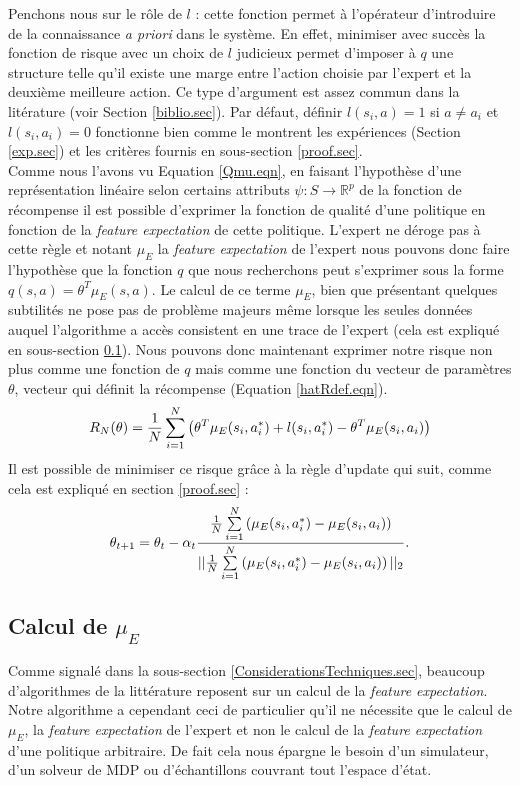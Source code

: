 \documentclass[publibook-draft]{CAp2012}
\begin{document}
Penchons nous sur le rôle de $l$ : cette fonction permet à l'opérateur d'introduire de la connaissance \emph{a priori} dans le système. En effet, minimiser avec succès la fonction de risque avec un choix de $l$ judicieux permet d'imposer à $q$ une structure telle qu'il existe une marge entre l'action choisie par l'expert et la deuxième meilleure action. Ce type d'argument est assez commun dans la litérature (voir Section \ref{biblio.sec}). Par défaut, définir $l(s_i,a) = 1$ si $a\neq a_i$ et $l(s_i,a_i)=0$ fonctionne bien comme le montrent les expériences (Section \ref{exp.sec}) et les critères fournis en sous-section \ref{proof.sec}.\\


Comme nous l'avons vu Equation \eqref{Qmu.eqn}, en faisant l'hypothèse d'une représentation linéaire selon certains attributs $\psi : S\rightarrow \mathbb{R}^p$ de la fonction de récompense il est possible d'exprimer la fonction de qualité d'une politique en fonction de la {\it feature expectation} de cette politique. L'expert ne déroge pas à cette règle et notant $\mu_E$ la {\it feature expectation} de l'expert nous pouvons donc faire l'hypothèse que la fonction $q$ que nous recherchons peut s'exprimer sous la forme $q(s,a) = \theta^T\mu_E(s,a)$. Le calcul de ce terme $\mu_E$, bien que présentant quelques subtilités ne pose pas de problème majeurs même lorsque les seules données auquel l'algorithme a accès consistent en une trace de l'expert (cela est expliqué en sous-section \ref{calculmu.sec}). Nous pouvons donc maintenant exprimer notre risque non plus comme une fonction de $q$ mais comme une fonction du vecteur de paramètres $\theta$, vecteur qui définit la récompense (Equation \eqref{hatRdef.eqn}).
   \begin{equation}
   R_N(\theta) = {1\over N} \sum_{i=1}^N\left(\theta ^T \mu_E(s_i,a^*_i) + l(s_i,a^*_i) - \theta ^T \mu_E(s_i,a_i) \right)
   \end{equation}
   Il est possible de minimiser ce risque grâce à la règle d'update qui suit, comme cela est expliqué en section \ref{proof.sec} :
   \begin{equation}
   \theta_{t+1} = \theta_t -\alpha_t{{1\over N}\sum\limits_{i=1}^N\left(\mu_E(s_i,a^*_i) - \mu_E(s_i,a_i)\right)\over ||{1\over N}\sum\limits_{i=1}^N\left(\mu_E(s_i,a^*_i) - \mu_E(s_i,a_i)\right)||_2}.
   \end{equation}
\subsection{Calcul de $\mu_E$}
\label{calculmu.sec}
Comme signalé dans la sous-section \ref{ConsiderationsTechniques.sec}, beaucoup d'algorithmes de la littérature reposent sur un calcul de la {\it feature expectation}. Notre algorithme a cependant ceci de particulier qu'il ne nécessite que le calcul de $\mu_E$, la {\it feature expectation} de l'expert et non le calcul de la {\it feature expectation} d'une politique arbitraire. De fait cela nous épargne le besoin d'un simulateur, d'un solveur de MDP ou d'échantillons couvrant tout l'espace d'état.\\
\end{document}
